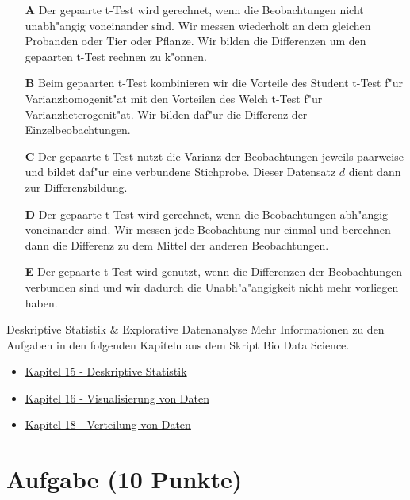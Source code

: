 \documentclass[a4paper, 10pt]{scrartcl}\usepackage[]{graphicx}\usepackage[]{xcolor}
\begin{document}
\begin{enumerate}
\item [\textbf{A} \msquare] Der gepaarte t-Test wird gerechnet, wenn die Beobachtungen nicht unabh{"a}ngig voneinander sind. Wir messen wiederholt an dem gleichen Probanden oder Tier oder Pflanze. Wir bilden die Differenzen um den gepaarten t-Test rechnen zu k{"o}nnen.
\item [\textbf{B} \msquare] Beim gepaarten t-Test kombinieren wir die Vorteile des Student t-Test f{"u}r Varianzhomogenit{"a}t mit den Vorteilen des Welch t-Test f{"u}r Varianzheterogenit{"a}t. Wir bilden daf{"u}r die Differenz der Einzelbeobachtungen.
\item [\textbf{C} \msquare] Der gepaarte t-Test nutzt die Varianz der Beobachtungen jeweils paarweise und bildet daf{"u}r eine verbundene Stichprobe. Dieser Datensatz $d$ dient dann zur Differenzbildung.
\item [\textbf{D} \msquare] Der gepaarte t-Test wird gerechnet, wenn die Beobachtungen abh{"a}ngig voneinander sind. Wir messen jede Beobachtung nur einmal und berechnen dann die Differenz zu dem Mittel der anderen Beobachtungen.
\item [\textbf{E} \msquare] Der gepaarte t-Test wird genutzt, wenn die Differenzen der Beobachtungen verbunden sind und wir dadurch die Unabh{"a}{"a}ngigkeit nicht mehr vorliegen haben.
\end{enumerate}
\clearpage
\begin{graybox}{Deskriptive Statistik \& Explorative Datenanalyse}
Mehr Informationen zu den Aufgaben in den folgenden Kapiteln aus dem Skript Bio Data Science.
  \begin{itemize}
  \item \href{https://jkruppa.github.io/eda-descriptive.html}{Kapitel 15 - Deskriptive Statistik}
  \item \href{https://jkruppa.github.io/eda-ggplot.html}{Kapitel 16 - Visualisierung von Daten}
  \item \href{https://jkruppa.github.io/eda-distribution.html}{Kapitel 18 - Verteilung von Daten}
  \end{itemize}
\end{graybox}
\clearpage

\section{Aufgabe \hfill (10 Punkte)}
\end{document}
